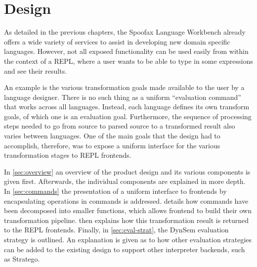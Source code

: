 \chapter{Design}
\label{cha:design}

As detailed in the previous chapters, the Spoofax Language Workbench already
offers a wide variety of services to assist in developing new domain specific
languages. However, not all exposed functionality can be used easily from within
the context of a REPL, where a user wants to be able to type in some expressions
and see their results.

An example is the various transformation goals made available to the user by a
language designer. There is no such thing as a uniform ``evaluation command''
that works across all languages. Instead, each language defines its own
transform goals, of which one is an evaluation goal.  Furthermore, the sequence
of processing steps needed to go from source to parsed source to a transformed
result also varies between languages. One of the main goals that the design had to
accomplish, therefore, was to expose a uniform interface for the various
transformation stages to REPL frontends.

In \cref{sec:overview} an overview of the product design and its various
components is given first. Afterwards, the individual components are explained
in more depth. In \cref{sec:commands} the presentation of a uniform interface to
frontends by encapsulating operations in commands is addressed.
 details how commands have been decomposed into smaller
functions, which allows frontend to build their own transformation pipeline.
 then explains how this transformation result is returned to
the REPL frontends. Finally, in \cref{sec:eval-strat}, the DynSem evaluation
strategy is outlined.  An explanation is given as to how other evaluation
strategies can be added to the existing design to support other interpreter
backends, such as Stratego.











